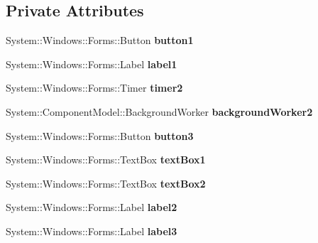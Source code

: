 \subsection*{Private Attributes}
\begin{DoxyCompactItemize}
\item 
\mbox{\label{class_glasses_1_1_my_form_a1a8e3704bfc68a9c0fdd944b8324b9a6}} 
System\+::\+Windows\+::\+Forms\+::\+Button {\bfseries button1}
\item 
\mbox{\label{class_glasses_1_1_my_form_adc1efde6a83941443672f7fd68d1c47e}} 
System\+::\+Windows\+::\+Forms\+::\+Label {\bfseries label1}
\item 
\mbox{\label{class_glasses_1_1_my_form_ae1b14651618e38b15636cf7c3f518723}} 
System\+::\+Windows\+::\+Forms\+::\+Timer {\bfseries timer2}
\item 
\mbox{\label{class_glasses_1_1_my_form_a7f7935818eb146195eb4a17f2474c8a5}} 
System\+::\+Component\+Model\+::\+Background\+Worker {\bfseries background\+Worker2}
\item 
\mbox{\label{class_glasses_1_1_my_form_a202959618fa214327461024aed2ef17c}} 
System\+::\+Windows\+::\+Forms\+::\+Button {\bfseries button3}
\item 
\mbox{\label{class_glasses_1_1_my_form_a3fab67264785232b2f88af444c74b695}} 
System\+::\+Windows\+::\+Forms\+::\+Text\+Box {\bfseries text\+Box1}
\item 
\mbox{\label{class_glasses_1_1_my_form_a930785dc4777169c918b479f56ef0e1d}} 
System\+::\+Windows\+::\+Forms\+::\+Text\+Box {\bfseries text\+Box2}
\item 
\mbox{\label{class_glasses_1_1_my_form_a3f8ed7afb6b3eb449d3ddac4cbf04c0c}} 
System\+::\+Windows\+::\+Forms\+::\+Label {\bfseries label2}
\item 
\mbox{\label{class_glasses_1_1_my_form_a4541faa1c3d1fa049a51918023d93225}} 
System\+::\+Windows\+::\+Forms\+::\+Label {\bfseries label3}

\end{DoxyCompactItemize}
